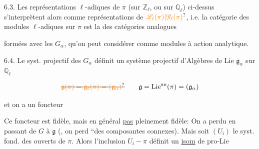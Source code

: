 6.3. Les représentations $\ell$-adiques de $\pi$ (sur $\mathbb Z_\ell$, ou sur $\mathbb Q_\ell$) ci-dessus s'interprètent alors comme représentations  de $\unsure{\mathscr L_\ell(\pi)|\mathscr G_\ell(\pi)}$, i.e. la catégorie des modules $\ell$-adiques sur $\pi$ est la  des catégories analogues

formées avec les $G_\alpha$, qu'on peut considérer comme modules à action analytique.

6.4. Le syst. projectif des $G_\alpha$ définit un système projectif d'Algèbres de Lie $\mathfrak g_\alpha$ sur $\mathbb Q_\ell$

\[
\deleted{\unsure{\mathfrak g(\pi)=\mathfrak g_\ell(\pi)=(\mathfrak g_\alpha)}}\qquad
\mathfrak g=\operatorname{Lie}^{\mathrm{an}}(\pi)=(\mathfrak g_\alpha)
\]

et on a un foncteur


Ce foncteur est fidèle, mais en général \uline{pas} pleinement fidèle: On a perdu en passant de  $G$ à $\mathfrak g$ (, on perd ``des composantes connexes). Mais soit $(U_i)$ le syst. fond. des  ouverts de $\pi$. Alors l'inclusion $U_i\mathbin{-}\pi$ définit un \uline{isom} de pro-Lie


